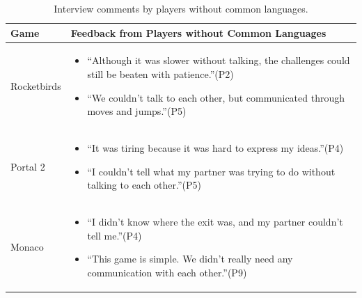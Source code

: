 \vspace{4ex}
\begin{table}[htbp]
    \centering
    \begin{tabular}{|p{100pt}|p{250pt}|}
        \hline
            Game & Feedback from Players without Common Languages\\
        \hline
        	Rocketbirds & \begin{itemize}
	 	 \item ``Although it was slower without talking, the challenges could still 
    	be beaten with patience.''(P2)
    	\item ``We couldn't talk to each other, but communicated through moves and jumps.''(P5)
	  	\end{itemize}
    	\\
        \hline
            Portal 2 & 
    	\begin{itemize}
    	\item ``It was tiring because it was hard to express my ideas.''(P4)
    	\item ``I couldn't tell what my partner was trying to do without talking to each other.''(P5)
    	\end{itemize}
    	\\
        \hline
        Monaco & 
    	\begin{itemize}
    	\item ``I didn't know where the exit was, and my partner couldn't tell me.''(P4)
    	\item ``This game is simple. We didn't really need any communication with each other.''(P9)
    	\end{itemize}
    	\\
    	\hline
    \end{tabular}
    \caption{Interview comments by players without common languages.}
  	\label{tab:table1}
\end{table}


